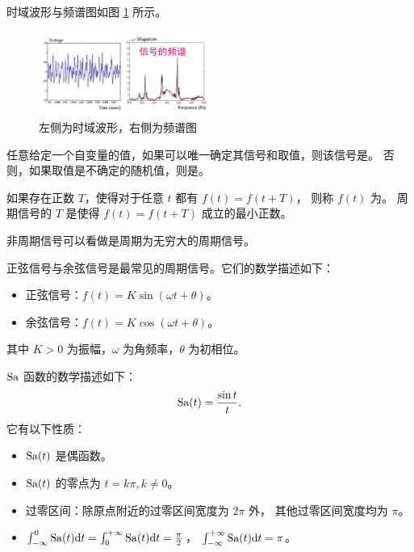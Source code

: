 \begin{example}[时域波形与频谱图]
    时域波形与频谱图如图 \ref{fig:wave-spectrum} 所示。
    \begin{figure}[H]
        \centering
        \includegraphics[width=0.5\textwidth]{chap1/img/wave-spectrum.png}
        \caption{左侧为时域波形，右侧为频谱图}
        \label{fig:wave-spectrum}
    \end{figure}
\end{example}

\begin{definition}[确定信号与随机信号]
    任意给定一个自变量的值，如果可以唯一确定其信号和取值，则该信号是。
    否则，如果取值是不确定的随机值，则是。
\end{definition}

\begin{definition}[周期信号]
    如果存在正数 $T$，使得对于任意 $t$ 都有 $f(t) = f(t + T)$，
    则称 $f(t)$ 为。
    周期信号的 $T$ 是使得 $f(t) = f(t + T)$ 成立的最小正数。
\end{definition}

\begin{remark}
    非周期信号可以看做是周期为无穷大的周期信号。
\end{remark}

\begin{example}[正弦信号与余弦信号]
    正弦信号与余弦信号是最常见的周期信号。它们的数学描述如下：
    \begin{itemize}
        \item 正弦信号：$f(t) = K\sin(\omega t + \theta)$。
        \item 余弦信号：$f(t) = K\cos(\omega t + \theta)$。
    \end{itemize}
    其中 $K > 0$ 为振幅，$\omega$ 为角频率，$\theta$ 为初相位。
\end{example}

\begin{example}[$\sa$ 函数]
    $\sa$ 函数的数学描述如下：
    \begin{align*}
        \mathrm{Sa}(t) = \frac{\sin t}{t}.
    \end{align*}
    它有以下性质：
    \begin{itemize}
        \item $\mathrm{Sa}(t)$ 是偶函数。
        \item $\mathrm{Sa}(t)$ 的零点为 $t = k\pi, k \ne 0$。
        \item 过零区间：除原点附近的过零区间宽度为 $2\pi$ 外，
            其他过零区间宽度均为 $\pi$。
        \item $\int_{-\infty}^{0}\mathrm{Sa}(t)\mathrm{d}t = \int_{0}^{+\infty}\mathrm{Sa}(t)\mathrm{d}t = \frac{\pi}{2}$，
            $\int_{-\infty}^{+\infty}\mathrm{Sa}(t)\mathrm{d}t = \pi$。
    \end{itemize}
\end{example}

